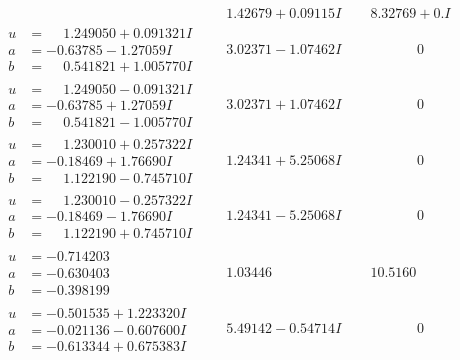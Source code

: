 \documentclass[1p]{elsarticle_modified}
\theoremstyle{definition}
\begin{document}
$$\begin{array}{c|c|c}
 & \phantom{-}1.42679 + 0.09115 I & \phantom{-}8.32769 + 0. I\phantom{ +0.000000I} \\ \hline\begin{aligned}
u &= \phantom{-}1.249050 + 0.091321 I \\
a &= -0.63785 - 1.27059 I \\
b &= \phantom{-}0.541821 + 1.005770 I\end{aligned}
 & \phantom{-}3.02371 - 1.07462 I & \phantom{-0.000000 } 0 \\ \hline\begin{aligned}
u &= \phantom{-}1.249050 - 0.091321 I \\
a &= -0.63785 + 1.27059 I \\
b &= \phantom{-}0.541821 - 1.005770 I\end{aligned}
 & \phantom{-}3.02371 + 1.07462 I & \phantom{-0.000000 } 0 \\ \hline\begin{aligned}
u &= \phantom{-}1.230010 + 0.257322 I \\
a &= -0.18469 + 1.76690 I \\
b &= \phantom{-}1.122190 - 0.745710 I\end{aligned}
 & \phantom{-}1.24341 + 5.25068 I & \phantom{-0.000000 } 0 \\ \hline\begin{aligned}
u &= \phantom{-}1.230010 - 0.257322 I \\
a &= -0.18469 - 1.76690 I \\
b &= \phantom{-}1.122190 + 0.745710 I\end{aligned}
 & \phantom{-}1.24341 - 5.25068 I & \phantom{-0.000000 } 0 \\ \hline\begin{aligned}
u &= -0.714203\phantom{ +0.000000I} \\
a &= -0.630403\phantom{ +0.000000I} \\
b &= -0.398199\phantom{ +0.000000I}\end{aligned}
 & \phantom{-}1.03446\phantom{ +0.000000I} & \phantom{-}10.5160\phantom{ +0.000000I} \\ \hline\begin{aligned}
u &= -0.501535 + 1.223320 I \\
a &= -0.021136 - 0.607600 I \\
b &= -0.613344 + 0.675383 I\end{aligned}
 & \phantom{-}5.49142 - 0.54714 I & \phantom{-0.000000 } 0 \\ \hline\begin{aligned}

\end{aligned}
\end{array}$$
\end{document}
